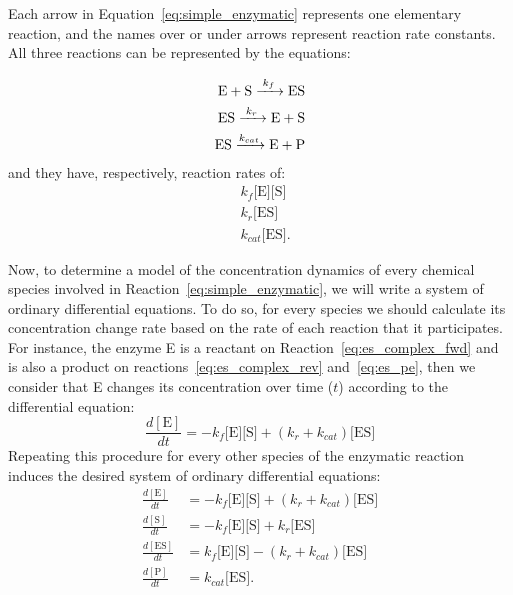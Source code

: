 Each arrow in Equation~\ref{eq:simple_enzymatic} represents one 
elementary reaction, and the names over or under arrows represent 
reaction rate constants. All three reactions can be represented by the
equations:

\begin{subequations}
\begin{align}
\ce{
    E + S ->[\ce{$k_f$}] ES 
} \label{eq:es_complex_fwd} \\
\ce{
    ES ->[$k_r$] E + S
} \label{eq:es_complex_rev} \\
\ce{
    ES ->[$k_{cat}$] E + P
} \label{eq:es_pe} 
\end{align}
\end{subequations}
and they have, respectively, reaction rates of:
\begin{equation*}
\begin{aligned}
    & k_f\text{[E][S]} \\
    & k_r\text{[ES]} \\
    & k_{cat}\text{[ES]}.
\end{aligned}
\end{equation*}

Now, to determine a model of the concentration dynamics of every 
chemical species involved in Reaction~\ref{eq:simple_enzymatic}, we will
write a system of ordinary differential equations. To do so, for every 
species we should calculate its concentration change rate based on the 
rate of each reaction that it participates. For instance, the enzyme E is a 
reactant on Reaction~\ref{eq:es_complex_fwd} and is also a product on 
reactions~\ref{eq:es_complex_rev} and~\ref{eq:es_pe}, then we consider 
that E changes its concentration over time ($t$) according to the 
differential equation:
\begin{equation}
    \frac{d[\text{E}]}{dt} = -k_f\text{[E][S]} + (k_r + k_{cat}) \text{[ES]}
\end{equation} 
Repeating this procedure for every other species of the enzymatic 
reaction induces the desired system of ordinary differential equations:
\begin{subequations}
    \label{eq:full_system}
    \begin{align}
        \frac{d[\text{E}]}{dt} & =  
            -k_f\text{[E][S]} + (k_r + k_{cat}) \text{[ES]} 
            \label{eq:dEdt} \\
        \frac{d[\text{S}]}{dt}  & = 
            -k_f\text{[E][S]} + k_r\text{[ES]} 
            \label{eq:dSdt} \\
        \frac{d[\text{ES}]}{dt} & =  
            k_f\text{[E][S]} - (k_r + k_{cat}) \text{[ES]} 
            \label{eq:dESdt} \\
        \frac{d[\text{P}]}{dt} & = k_{cat}\text{[ES]} \label{eq:dPdt}.
    \end{align}
\end{subequations}

